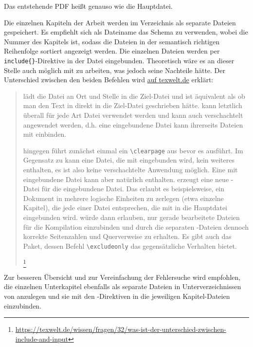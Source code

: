 Das entstehende PDF heißt genauso wie die Hauptdatei.

Die einzelnen Kapiteln der Arbeit werden im Verzeichnis  als separate Dateien gespeichert.
Es empfiehlt sich als Dateiname das Schema  zu verwenden, wobei  die Nummer des Kapitels ist,
sodass die Dateien in der semantisch richtigen Reihenfolge sortiert angezeigt werden.
Die einzelnen Dateien werden per \verb+include{}+-Direktive in der Datei  eingebunden.
Theoretisch wäre es an dieser Stelle auch möglich mit \verb++ zu arbeiten, was jedoch seine Nachteile hätte.
Der Unterschied zwischen den beiden Befehlen wird \href{https://texwelt.de/wissen/fragen/32/was-ist-der-unterschied-zwischen-include-and-input}{auf texwelt.de} erklärt:

\begin{quote}
{\small
\verb++ lädt die Datei an Ort und Stelle in die Ziel-Datei und ist äquivalent
als ob man den Text in  direkt in die Ziel-Datei geschrieben hätte.
\verb++ kann letztlich überall für jede Art Datei verwendet werden und kann auch verschachtelt angewendet werden,
d.h. eine eingebundene Datei kann ihrerseits Dateien mit \verb++ einbinden.

\verb++ hingegen führt zunächst einmal ein \verb+\clearpage+ aus bevor es \verb++ ausführt.
Im Gegensatz zu \verb++ kann eine Datei, die mit \verb++ eingebunden wird,
kein weiteres \verb++ enthalten, es ist also keine verschachtelte Anwendung möglich.
Eine mit \verb++ eingebundene Datei kann aber natürlich \verb++ enthalten.
\verb++ erzeugt eine neue -Datei für die eingebundene Datei.
Das erlaubt es beispielsweise, ein Dokument in mehrere logische Einheiten zu zerlegen (etwa einzelne Kapitel),
die jede einer Datei entsprechen, die mit \verb++ in die Hauptdatei eingebunden wird.
\verb++ würde dann erlauben, nur gerade bearbeitete Dateien für die Kompilation einzubinden
und durch die separaten -Dateien dennoch korrekte Seitenzahlen und Querverweise zu erhalten.
Es gibt auch das  Paket, dessen Befehl \verb+\excludeonly+ das gegensätzliche Verhalten bietet.%
}%
\footnote{\url{https://texwelt.de/wissen/fragen/32/was-ist-der-unterschied-zwischen-include-and-input}}
\end{quote}

Zur besseren Übersicht und zur Vereinfachung der Fehlersuche wird empfohlen,
die einzelnen Unterkapitel ebenfalls als separate Dateien in Unterverzeichnissen von  anzulegen
und sie mit den \verb++-Direktiven in die jeweiligen Kapitel-Dateien einzubinden.

